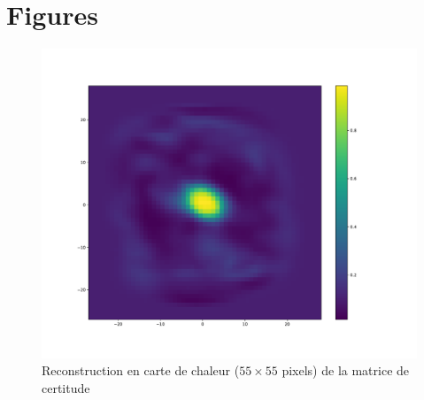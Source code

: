 
\chapter{Figures} %

\label{Figures} %



\begin{table}
\caption[Tableau]{Matériel utilisé pour réaliser les modélisations
}
\label{tab:materiel}
\end{table}

\begin{figure}[th]
\centering
\includegraphics[scale=0.4]{Figures/accuracy}
\decoRule %
\caption[Figure]{Reconstruction en carte de chaleur ($55\times 55$ pixels) de la matrice de certitude}
\label{fig:accuracy}
\end{figure}

